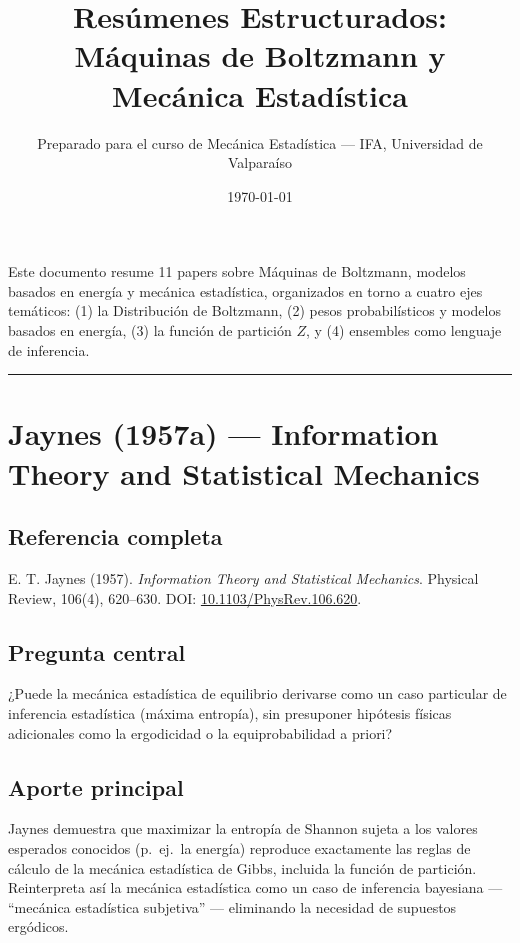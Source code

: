 \documentclass[12pt]{article}
\title{Resúmenes Estructurados: Máquinas de Boltzmann y Mecánica Estadística}
\author{Preparado para el curso de Mecánica Estadística --- IFA, Universidad de Valparaíso}
\date{\today}
\begin{document}
\maketitle

\noindent Este documento resume 11 papers sobre Máquinas de Boltzmann, modelos basados en
energía y mecánica estadística, organizados en torno a cuatro ejes temáticos: (1) la
Distribución de Boltzmann, (2) pesos probabilísticos y modelos basados en energía, (3) la
función de partición $Z$, y (4) ensembles como lenguaje de inferencia.

\bigskip
\hrule
\bigskip

\section{Jaynes (1957a) --- Information Theory and Statistical Mechanics}

\subsection*{Referencia completa}
E. T. Jaynes (1957). \textit{Information Theory and Statistical Mechanics}. Physical Review,
106(4), 620--630. DOI: \href{https://doi.org/10.1103/PhysRev.106.620}{10.1103/PhysRev.106.620}.
\cite{jaynes1957a}

\subsection*{Pregunta central}
¿Puede la mecánica estadística de equilibrio derivarse como un caso particular de inferencia
estadística (máxima entropía), sin presuponer hipótesis físicas adicionales como la
ergodicidad o la equiprobabilidad a priori?

\subsection*{Aporte principal}
Jaynes demuestra que maximizar la entropía de Shannon sujeta a los valores esperados conocidos
(p.\ ej.\ la energía) reproduce exactamente las reglas de cálculo de la mecánica estadística de
Gibbs, incluida la función de partición. Reinterpreta así la mecánica estadística como un caso
de inferencia bayesiana --- ``mecánica estadística subjetiva'' --- eliminando la necesidad de
supuestos ergódicos.
\end{document}
